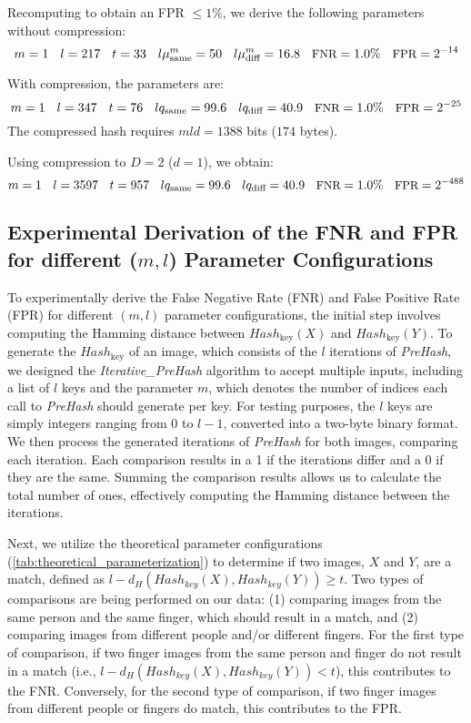 Recomputing to obtain an FPR \(\leq 1\%\), we derive the following parameters without compression:
\begin{equation}
\small
m = 1 \quad l = 217 \quad t = 33 \quad l\mu_{\text{same}}^m = 50 \quad l\mu_{\text{diff}}^m = 16.8 \quad \text{FNR} = 1.0\% \quad \text{FPR} = 2^{-14}
\end{equation}

With compression, the parameters are:
\begin{equation}
\small
m = 1 \quad l = 347 \quad t = 76 \quad lq_{\text{same}} = 99.6 \quad lq_{\text{diff}} = 40.9 \quad \text{FNR} = 1.0\% \quad \text{FPR} = 2^{-25}
\end{equation}
The compressed hash requires \( mld = 1388 \) bits (\( 174 \) bytes).

Using compression to \( D = 2 \) (\( d = 1 \)), we obtain:
\begin{equation}
\small
m = 1 \quad l = 3597 \quad t = 957 \quad lq_{\text{same}} = 99.6 \quad lq_{\text{diff}} = 40.9 \quad \text{FNR} = 1.0\% \quad \text{FPR} = 2^{-488}
\end{equation}


\subsection{Experimental Derivation of the FNR and FPR for different (\(m, l\)) Parameter Configurations}
To experimentally derive the False Negative Rate (FNR) and False Positive Rate (FPR) for different \((m, l)\) parameter configurations, the initial step involves computing the Hamming distance between \( Hash_{\text{key}}(X) \) and \( Hash_{\text{key}}(Y) \). To generate the \( Hash_{\text{key}} \) of an image, which consists of the \( l \) iterations of \textit{PreHash}, we designed the \textit{Iterative\_PreHash} algorithm to accept multiple inputs, including a list of \( l \) keys and the parameter \( m \), which denotes the number of indices each call to \textit{PreHash} should generate per key. For testing purposes, the \( l \) keys are simply integers ranging from 0 to \( l-1 \), converted into a two-byte binary format. We then process the generated iterations of \textit{PreHash} for both images, comparing each iteration. Each comparison results in a 1 if the iterations differ and a 0 if they are the same. Summing the comparison results allows us to calculate the total number of ones, effectively computing the Hamming distance between the iterations.

Next, we utilize the theoretical parameter configurations (\ref{tab:theoretical_parameterization}) to determine if two images, \(X\) and \(Y\), are a match, defined as \(l - d_H(Hash_{key}(X), Hash_{key}(Y)) \geq t \). Two types of comparisons are being performed on our data: (1) comparing images from the same person and the same finger, which should result in a match, and (2) comparing images from different people and/or different fingers. For the first type of comparison, if two finger images from the same person and finger do not result in a match (i.e., \( l - d_H(Hash_{key}(X), Hash_{key}(Y)) < t \)), this contributes to the FNR. Conversely, for the second type of comparison, if two finger images from different people or fingers do match, this contributes to the FPR.

